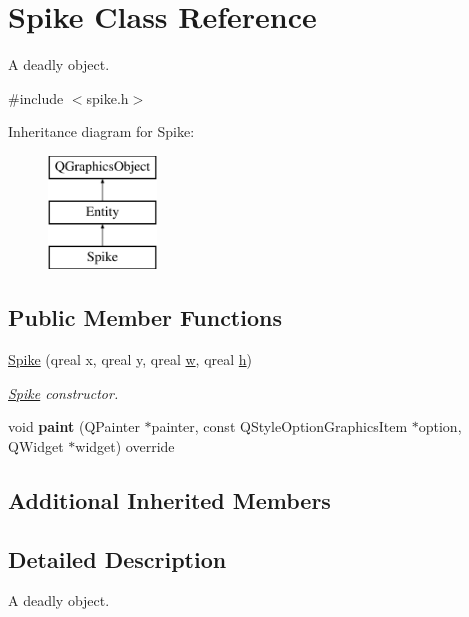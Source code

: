 \hypertarget{class_spike}{}\section{Spike Class Reference}
\label{class_spike}


A deadly object.  




{\ttfamily \#include $<$spike.\+h$>$}

Inheritance diagram for Spike\+:\begin{figure}[H]
\begin{center}
\leavevmode
\includegraphics[height=3.000000cm]{class_spike}
\end{center}
\end{figure}
\subsection*{Public Member Functions}
\begin{DoxyCompactItemize}
\item 
\hyperlink{class_spike_ac2fcf8a6f3388d5413c6080c67b33341}{Spike} (qreal x, qreal y, qreal \hyperlink{class_entity_a351a26475f8c124429a638483e95fa8e}{w}, qreal \hyperlink{class_entity_a639fea375adab80851778acb51757fb8}{h})
\begin{DoxyCompactList}\small\item\em \hyperlink{class_spike}{Spike} constructor. \end{DoxyCompactList}\item 
\mbox{\label{class_spike_aca3c30a784c67d075ab083ff9e043133}} 
void {\bfseries paint} (Q\+Painter $\ast$painter, const Q\+Style\+Option\+Graphics\+Item $\ast$option, Q\+Widget $\ast$widget) override
\end{DoxyCompactItemize}
\subsection*{Additional Inherited Members}


\subsection{Detailed Description}
A deadly object. 

